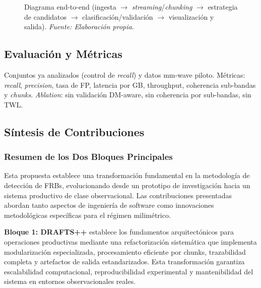 \begin{figure}[H]
\caption{\label{fig:pipeline-end-to-end} Diagrama end-to-end (ingesta $\to$ \emph{streaming}/\emph{chunking} $\to$ estrategia de candidatos $\to$ clasificación/validación $\to$ visualización y salida). \textit{Fuente: Elaboración propia}.}
\end{figure}

\subsection{Evaluación y Métricas}

Conjuntos ya analizados (control de \emph{recall}) y datos mm-wave piloto. Métricas: \emph{recall}, \emph{precision}, tasa de FP, latencia por GB, throughput, coherencia sub-bandas y \emph{chunks}. \emph{Ablation}: sin validación DM-aware, sin coherencia por sub-bandas, sin TWL.

\subsection{Síntesis de Contribuciones}

\subsubsection{Resumen de los Dos Bloques Principales}

Esta propuesta establece una transformación fundamental en la metodología de detección de FRBs, evolucionando desde un prototipo de investigación hacia un sistema productivo de clase observacional. Las contribuciones presentadas abordan tanto aspectos de ingeniería de software como innovaciones metodológicas específicas para el régimen milimétrico.

\textbf{Bloque 1: DRAFTS++} establece los fundamentos arquitectónicos para operaciones productivas mediante una refactorización sistemática que implementa modularización especializada, procesamiento eficiente por chunks, trazabilidad completa y artefactos de salida estandarizados. Esta transformación garantiza escalabilidad computacional, reproducibilidad experimental y mantenibilidad del sistema en entornos observacionales reales.

